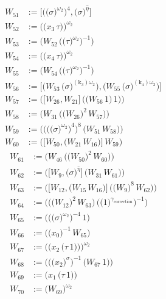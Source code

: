 \begin{align*}
W_{51} &:= \bigl[\bigl(\bigl(\sigma\bigr)^{\omega_2}\bigr)^{4},\bigl(\sigma\bigr)^{\widehat{\eta}}\bigr] \\
W_{52} &:= \bigl(\bigl(x_{3}\,\tau\bigr)\bigr)^{\omega_2} \\
W_{53} &:= \bigl(W_{52}\,\bigl(\bigl(\tau\bigr)^{\omega_2}\bigr)^{-1}\bigr) \\
W_{54} &:= \bigl(\bigl(x_{4}\,\tau\bigr)\bigr)^{\omega_2} \\
W_{55} &:= \bigl(W_{54}\,\bigl(\bigl(\tau\bigr)^{\omega_2}\bigr)^{-1}\bigr) \\
W_{56} &:= \bigl[\bigl(W_{53}\,\bigl(\sigma\bigr)^{(\mathrm{k}_{3})\omega_2}\bigr),\bigl(W_{55}\,\bigl(\sigma\bigr)^{(\mathrm{k}_{4})\omega_2}\bigr)\bigr] \\
W_{57} &:= \bigl(\bigl[W_{26},W_{21}\bigr]\,\bigl(\bigl(W_{56}\,1\bigr)\,1\bigr)\bigr) \\
W_{58} &:= \bigl(W_{31}\,\bigl(\bigl(W_{26}\bigr)^{2}\,W_{57}\bigr)\bigr) \\
W_{59} &:= \bigl(\bigl(\bigl(\bigl(\sigma\bigr)^{\omega_2}\bigr)^{4}\bigr)^{8}\,\bigl(W_{51}\,W_{58}\bigr)\bigr) \\
W_{60} &:= \bigl(\bigl[W_{50},\bigl(W_{21}\,W_{16}\bigr)\bigr]\,W_{59}\bigr)
\end{align*}
\begin{align*}
W_{61} &:= \bigl(W_{46}\,\bigl(\bigl(W_{50}\bigr)^{2}\,W_{60}\bigr)\bigr) \\
W_{62} &:= \bigl(\bigl[W_{9},\bigl(\sigma\bigr)^{\widehat{\eta}}\bigr]\,\bigl(W_{31}\,W_{61}\bigr)\bigr) \\
W_{63} &:= \bigl(\bigl[W_{12},\bigl(W_{15}\,W_{16}\bigr)\bigr]\,\bigl(\bigl(W_{9}\bigr)^{8}\,W_{62}\bigr)\bigr) \\
W_{64} &:= \bigl(\bigl(\bigl(W_{12}\bigr)^{2}\,W_{63}\bigr)\,\bigl(\bigl(1\bigr)^{\gamma_{\mathrm{correction}}}\bigr)^{-1}\bigr) \\
W_{65} &:= \bigl(\bigl(\bigl(\sigma\bigr)^{\omega_2}\bigr)^{-4}\,1\bigr) \\
W_{66} &:= \bigl(\bigl(x_{0}\bigr)^{-1}\,W_{65}\bigr) \\
W_{67} &:= \bigl(\bigl(x_{2}\,\bigl(\tau\,1\bigr)\bigr)\bigr)^{\omega_2} \\
W_{68} &:= \bigl(\bigl(\bigl(x_{2}\bigr)^{\sigma}\bigr)^{-1}\,\bigl(W_{67}\,1\bigr)\bigr) \\
W_{69} &:= \bigl(x_{1}\,\bigl(\tau\,1\bigr)\bigr) \\
W_{70} &:= \bigl(W_{69}\bigr)^{\omega_2}
\end{align*}
